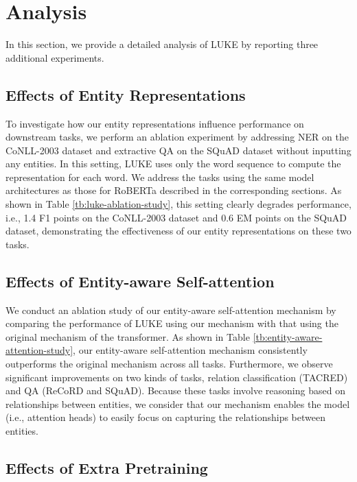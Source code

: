 \documentclass[11pt,a4paper]{article}
\begin{document}
\begin{table}[t]
\section{Analysis}
\label{sec:analysis}

In this section, we provide a detailed analysis of LUKE by reporting three additional experiments.

\subsection{Effects of Entity Representations}

To investigate how our entity representations influence performance on downstream tasks, we perform an ablation experiment by addressing NER on the CoNLL-2003 dataset and extractive QA on the SQuAD dataset without inputting any entities.
In this setting, LUKE uses only the word sequence to compute the representation for each word.
We address the tasks using the same model architectures as those for RoBERTa described in the corresponding sections.
As shown in Table \ref{tb:luke-ablation-study}, this setting clearly degrades performance, i.e., 1.4 F1 points on the CoNLL-2003 dataset and 0.6 EM points on the SQuAD dataset, demonstrating the effectiveness of our entity representations on these two tasks.

\subsection{Effects of Entity-aware Self-attention}

We conduct an ablation study of our entity-aware self-attention mechanism by comparing the performance of LUKE using our mechanism with that using the original mechanism of the transformer.
As shown in Table \ref{tb:entity-aware-attention-study}, our entity-aware self-attention mechanism consistently outperforms the original mechanism across all tasks.
Furthermore, we observe significant improvements on two kinds of tasks, relation classification (TACRED) and QA (ReCoRD and SQuAD).
Because these tasks involve reasoning based on relationships between entities, we consider that our mechanism enables the model (i.e., attention heads) to easily focus on capturing the relationships between entities.

\subsection{Effects of Extra Pretraining}


\end{table}
\end{document}
